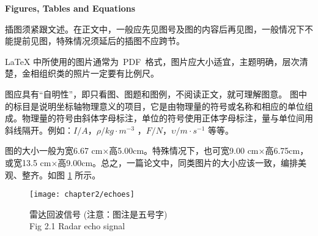 
\begin{raggedright}{\bfseries{}\hspace{0.5em}Figures, Tables and Equations} \vspace{9pt} \end{raggedright}



插图须紧跟文述。在正文中，一般应先见图号及图的内容后再见图，一般情况下不能提前见图，特殊情况须延后的插图不应跨节。

\LaTeX{} 中所使用的图片通常为~PDF~格式，图片应大小适宜，主题明确，层次清楚，金相组织类的照片一定要有比例尺。

图应具有“自明性”，即只看图、图题和图例，不阅读正文，就可理解图意。
图中的标目是说明坐标轴物理意义的项目，它是由物理量的符号或名称和相应的单位组成。物理量的符号由斜体字母标注，单位的符号使用正体字母标注，量与单位间用斜线隔开。例如：$I / A$，$\rho / kg \cdot m^{-3}$ ，$F/N$，$\upsilon / m \cdot s^{-1} $ 等等。

图的大小一般为宽6.67 cm×高5.00cm。特殊情况下，也可宽9.00 cm×高6.75cm，或宽13.5 cm×高9.00cm。总之，一篇论文中，同类图片的大小应该一致，编排美观、整齐。如图 \ref{fig_ch2_echoes} 所示。
\begin{figure}[!ht]
	\centering
	\texttt{[image: chapter2/echoes]}
	\caption{ 雷达回波信号 ({\color{red}注意}：图注是五号字) \\ Fig 2.1 Radar echo signal}
  \label{fig_ch2_echoes}
\end{figure}



